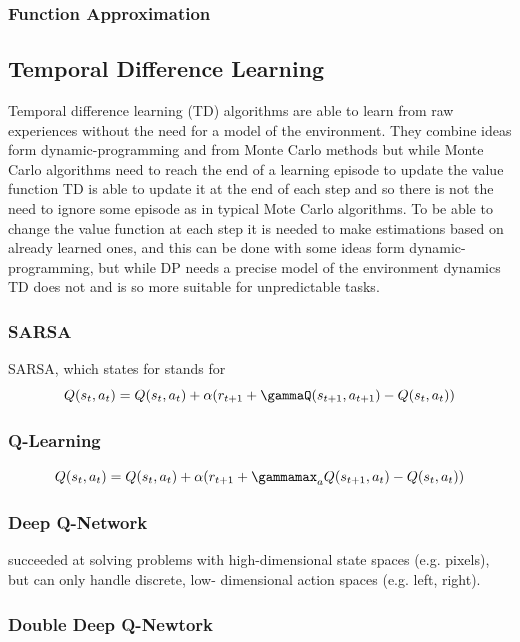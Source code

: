\subsubsection{Function Approximation}

\subsection{Temporal Difference Learning}
Temporal difference learning (TD) \cite{irl} algorithms are able to learn from raw experiences without the need for a model of the environment. They combine ideas form dynamic-programming and from Monte Carlo methods but while Monte Carlo algorithms need to reach the end of a learning episode to update the value function TD is able to update it at the end of each step and so there is not the need to ignore some episode as in typical Mote Carlo algorithms.
To be able to change the value function at each step it is needed to make estimations based on already learned ones, and this can be done with some ideas form dynamic-programming, but while DP needs a precise model of the environment dynamics TD does not and is so more suitable for unpredictable tasks.
\subsubsection{SARSA}
SARSA, which states for stands for 
\[Q(s_t,a_t)=Q(s_t,a_t)+\alpha(r_{t+1}+\gammaQ(s_{t+1},a_{t+1})-Q(s_t,a_t))\]
\subsubsection{Q-Learning}
\[Q(s_t,a_t)=Q(s_t,a_t)+\alpha(r_{t+1}+\gammamax_aQ(s_{t+1},a_t)-Q(s_t,a_t))\]

\subsubsection{Deep Q-Network}
succeeded at solving problems with high-dimensional
state spaces (e.g. pixels), but can only handle discrete, low-
dimensional action spaces (e.g. left, right).
\subsubsection{Double Deep Q-Newtork}


